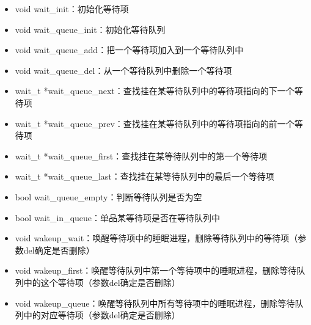 \begin{itemize}
\tightlist
\item
  void wait\_init：初始化等待项
\item
  void wait\_queue\_init：初始化等待队列
\item
  void wait\_queue\_add：把一个等待项加入到一个等待队列中
\item
  void wait\_queue\_del：从一个等待队列中删除一个等待项
\item
  wait\_t
  *wait\_queue\_next：查找挂在某等待队列中的等待项指向的下一个等待项
\item
  wait\_t
  *wait\_queue\_prev：查找挂在某等待队列中的等待项指向的前一个等待项
\item
  wait\_t *wait\_queue\_first：查找挂在某等待队列中的第一个等待项
\item
  wait\_t *wait\_queue\_last：查找挂在某等待队列中的最后一个等待项
\item
  bool wait\_queue\_empty：判断等待队列是否为空
\item
  bool wait\_in\_queue：单品某等待项是否在等待队列中
\item
  void
  wakeup\_wait：唤醒等待项中的睡眠进程，删除等待队列中的等待项（参数del确定是否删除）
\item
  void
  wakeup\_first：唤醒等待队列中第一个等待项中的睡眠进程，删除等待队列中的这个等待项（参数del确定是否删除）
\item
  void
  wakeup\_queue：唤醒等待队列中所有等待项中的睡眠进程，删除等待队列中的对应等待项（参数del确定是否删除）
\end{itemize}
